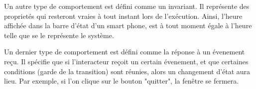 \documentclass{ihm}
\begin{document}
Un autre type de comportement est défini comme un invariant. Il
représente des proprietés qui resteront vraies à tout instant
lors de l'exécution. Ainsi, l'heure affichée dans la barre
d'état d'un smart phone, est à tout moment égale à l'heure telle
que se le représente le système.

Un dernier type de comportement est défini comme la réponse à un
évenement reçu. Il spécifie que si l'interacteur reçoit un
certain évenement, et que certaines conditions (garde de la
transition) sont réunies, alors un changement d'état aura lieu.
Par exemple, si l'on clique sur le bouton "quitter", la fenêtre
se fermera.





\small


\end{document}
